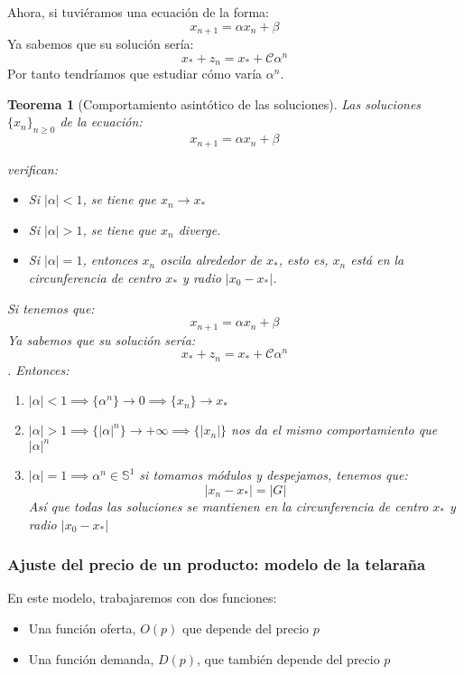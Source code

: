 \documentclass[11pt, a4paper, titlepage]{article}
\makeatletter
\renewenvironment{proof}[1][\proofname] {\vspace{-15pt}\par\pushQED{\qed}\normalfont\topsep6\p@\@plus6\p@\relax\trivlist\item[\hskip\labelsep\it#1\@addpunct{.}]\ignorespaces}{\popQED\endtrivlist\@endpefalse}
\theoremstyle{theorem-style}
\newtheorem*{nth}{Teorema}
\theoremstyle{definition-style}
\theoremstyle{remark-style}
\theoremstyle{example-style}
\newenvironment{nlist}
{\begin{enumerate}
\renewcommand\labelenumi{(\emph{\roman{enumi})}}}
{\end{enumerate}}
\makeatother
\begin{document}
Ahora, si tuviéramos una ecuación de la forma:
\[
x_{n+1}= \alpha x_n + \beta
\]
Ya sabemos que su solución sería:
\[
x_* +z_n = x_* + \mathcal{C}\alpha^n
\]
Por tanto tendríamos que estudiar cómo varía $\alpha^n$.


\begin{nth}[Comportamiento asintótico de las soluciones]
	Las soluciones $\{x_n\}_{n\geq0}$ de la ecuación:
\[
x_{n+1} = \alpha x_n + \beta
\]

verifican:

\begin{itemize}
\item Si $|\alpha| < 1$, se tiene que ${x_n} \to x_*$
\item Si $|\alpha| > 1$, se tiene que ${x_n}$ diverge.
\item Si $|\alpha| = 1$, entonces ${x_n}$ oscila alrededor de $x_*$, esto es, $x_n$ está en la circunferencia de centro $x_*$ y radio $|x_0 - x_*|$.
\end{itemize}\vspace{0.5cm}

	\begin{proof}
	Si tenemos que:
	\[
x_{n+1}= \alpha x_n + \beta
\]
Ya sabemos que su solución sería:
\[
x_* +z_n = x_* + \mathcal{C}\alpha^n
\]. Entonces:
\begin{nlist}
	\item $|\alpha|< 1 \implies \{\alpha^n\}\to 0 \implies \{x_n\} \to x_*$
	\item $|\alpha|> 1 \implies \{|\alpha|^n\}\to +\infty \implies \{|x_n|\}$ nos da el mismo comportamiento que $|\alpha|^n$
	\item $|\alpha| = 1 \implies \alpha^n \in \mathbb{S}^1$ si tomamos módulos y despejamos, tenemos que:
	\[
	|x_n -x_*| = |G|
	\]
	Así que todas las soluciones se mantienen en la circunferencia de centro $x_*$ y radio $|x_0-x_*|$
\end{nlist}
\end{proof}
\end{nth}

\subsubsection{Ajuste del precio de un producto: modelo de la telaraña}
En este modelo, trabajaremos con dos funciones: 
\begin{itemize}
	\item Una función oferta, $O(p)$ que depende del precio $p$
	\item Una función demanda, $D(p)$, que también depende del precio $p$
\end{itemize}
\end{document}
